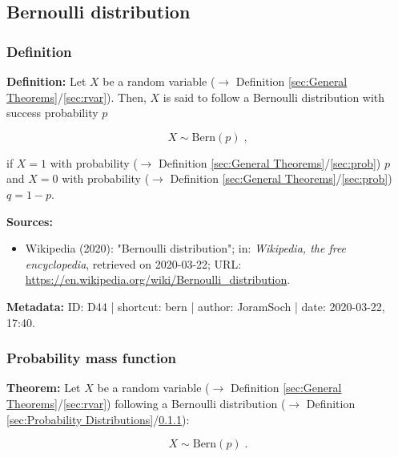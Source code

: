 \documentclass[a4paper,12pt,twoside]{book}
\begin{document}
\subsection{Bernoulli distribution}

\subsubsection[\textit{Definition}]{Definition} \label{sec:bern}
\setcounter{equation}{0}

\textbf{Definition:} Let $X$ be a random variable ($\rightarrow$ Definition \ref{sec:General Theorems}/\ref{sec:rvar}). Then, $X$ is said to follow a Bernoulli distribution with success probability $p$

\begin{equation} \label{eq:bern-bern}
X \sim \mathrm{Bern}(p) \; ,
\end{equation}

if $X = 1$ with probability ($\rightarrow$ Definition \ref{sec:General Theorems}/\ref{sec:prob}) $p$ and $X = 0$ with probability ($\rightarrow$ Definition \ref{sec:General Theorems}/\ref{sec:prob}) $q = 1-p$.


\vspace{1em}
\textbf{Sources:}
\begin{itemize}
\item Wikipedia (2020): "Bernoulli distribution"; in: \textit{Wikipedia, the free encyclopedia}, retrieved on 2020-03-22; URL: \url{https://en.wikipedia.org/wiki/Bernoulli_distribution}.
\end{itemize}


\vspace{1em}
\textbf{Metadata:} ID: D44 | shortcut: bern | author: JoramSoch | date: 2020-03-22, 17:40.
\vspace{1em}



\subsubsection[\textbf{Probability mass function}]{Probability mass function} \label{sec:bern-pmf}
\setcounter{equation}{0}

\textbf{Theorem:} Let $X$ be a random variable ($\rightarrow$ Definition \ref{sec:General Theorems}/\ref{sec:rvar}) following a Bernoulli distribution ($\rightarrow$ Definition \ref{sec:Probability Distributions}/\ref{sec:bern}):

\begin{equation} \label{eq:bern-pmf-Bern}
X \sim \mathrm{Bern}(p) \; .
\end{equation}
\end{document}
